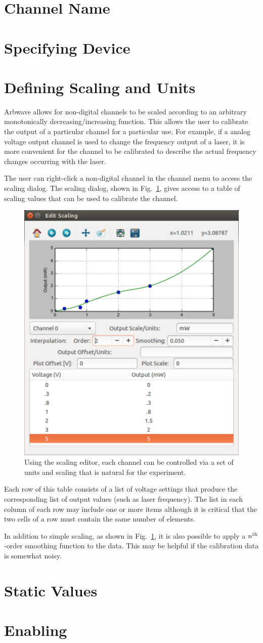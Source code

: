 \thispagestyle{fancy}
\pagestyle{fancy}
\section{Channel Name}
\section{Specifying Device}

\section{Defining Scaling and Units}
Arbwave allows for non-digital channels to be scaled according to an arbitrary
monotonically decreasing/increasing function.  This allows the user to calibrate
the output of a particular channel for a particular use.  For example, if a
analog voltage output channel is used to change the frequency output of a laser,
it is more convenient for the channel to be calibrated to describe the actual
frequency changes occurring with the laser.

The user can right-click a non-digital channel in the channel menu to access the
scaling dialog.  The scaling dialog, shown in Fig.~\ref{fig:channel:scaling}, gives
access to a table of scaling values that can be used to calibrate the channel.

\begin{figure}[hb]
  \centerline{\includegraphics[width=.4\textwidth]{figures/scaling}}
  \caption{
    Using the scaling editor, each channel can be controlled via a set of units
    and scaling that is natural for the experiment.
  }
  \label{fig:channel:scaling}
\end{figure}

Each row of this table consists of a list of voltage settings that produce the
corresponding list of output values (such as laser frequency).  The list in each
column of each row may include one or more items although it is critical that
the two cells of a row must contain the same number of elements.

In addition to simple scaling, as shown in Fig.~\ref{fig:channel:scaling}, it is
also possible to apply a $n^{\rm th}$-order smoothing function to the data.
This may be helpful if the calibration data is somewhat noisy.

\section{Static Values}
\section{Enabling}
